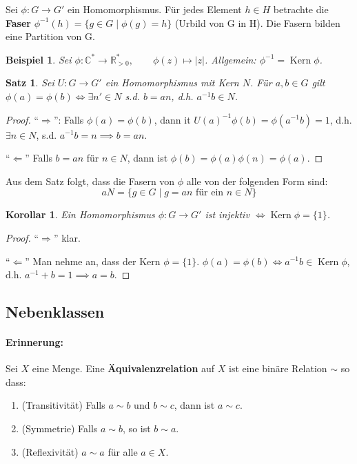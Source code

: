 \documentclass{article}
\theoremstyle{plain}
\newtheorem{theorem}{Satz}
\newtheorem{corollary}{Korollar}
\newtheorem{beispiel}{Beispiel}
\renewcommand{\ker}{\mathop{\text{Kern}}}
\newcommand{\defn}[1]{\textbf{#1}}
\newcommand{\R}{\mathbb{R}}
\newcommand{\C}{\mathbb{C}}
\begin{document}
Sei $\phi\colon G\to G'$ ein Homomorphismus. Für jedes Element $h\in H$ betrachte die \defn{Faser} $\phi^{-1}(h)=\{g\in G\mid\phi(g)=h\}$ (Urbild von G in H).
Die Fasern bilden eine Partition von G.

\begin{beispiel} Sei $\phi\colon \C^*\to\R^*_{>0},\qquad \phi(z)\mapsto |z|$.\qquad
Allgemein: $\phi^{-1} = \ker \phi$.
\end{beispiel}

\begin{theorem}
    Sei $U: G\to G'$ ein Homomorphismus mit Kern $N$. Für $a,b\in G$ gilt $\phi(a)=\phi(b) \Leftrightarrow \exists n'\in N$ s.d. $b=an$, d.h. $a^{-1}b\in N$.
\end{theorem}
\begin{proof}
    ``$\Rightarrow$'': Falls $\phi(a)=\phi(b)$, dann it $U(a)^{-1}\phi(b)=\phi(a^{-1}b)=1$, d.h. $\exists n\in N$, s.d. $a^{-1}b=n \implies b=an$.
    
    ``$\Leftarrow$'' Falls $b=an$ für $n\in N$, dann ist $\phi(b)=\phi(a)\phi(n)=\phi(a)$.
\end{proof}
Aus dem Satz folgt, dass die Fasern von $\phi$ alle von der folgenden Form sind: $$aN=\{g\in G\mid g=an \text{ für ein } n\in N\}$$
\begin{corollary}
    Ein Homomorphismus $\phi\colon G\to G'$ ist injektiv $\Leftrightarrow \ker\phi = \{1\}$.
\end{corollary}
\begin{proof}
    ``$\Rightarrow$'' klar.

    ``$\Leftarrow$'' Man nehme an, dass der Kern $\phi= \{1\}$. $\phi(a)=\phi(b)\Leftrightarrow a^{-1}b\in\ker\phi$, d.h. $a^{-1}+b=1\implies a=b$.
\end{proof}
\subsection*{Nebenklassen}
\paragraph{Erinnerung:} Sei $X$ eine Menge. Eine \defn{Äquivalenzrelation} auf $X$ ist eine binäre  Relation $\sim$ so dass: 
\begin{enumerate}[label=\roman*)]
    \item (Transitivität) Falls $a\sim b$ und $b\sim c$, dann ist $a\sim c$.
    \item (Symmetrie) Falls $a\sim b$, so ist $b\sim a$.
    \item (Reflexivität) $a\sim a$ für alle $a\in X$.
\end{enumerate}
\end{document}
